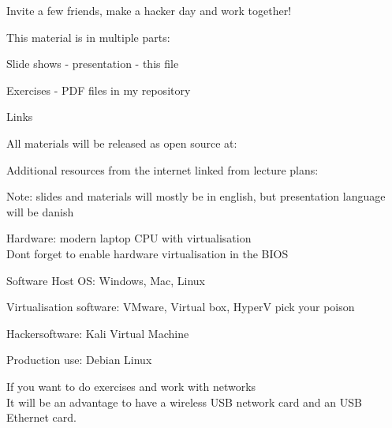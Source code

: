 \documentclass[Screen16to9,17pt]{foils}
\begin{document}
\vskip 1cm

\centerline{\LARGE Invite a few friends, make a hacker day and work together!}


\begin{list1}
\item This material is in multiple parts:
\begin{list2}
\item Slide shows - presentation - this file
\item Exercises - PDF files in my repository
\end{list2}
\item Links
\begin{list2}
\item All materials will be released as open source at:\\
\item Additional resources from the internet linked from lecture plans:\\
\end{list2}
\end{list1}

Note: slides and materials will mostly be in english, but presentation language will be danish





\begin{list2}
\item Hardware: modern laptop CPU with virtualisation\\
Dont forget to enable hardware virtualisation in the BIOS
\item Software Host OS: Windows, Mac, Linux
\item Virtualisation software: VMware, Virtual box, HyperV pick your poison
\item Hackersoftware: Kali Virtual Machine 
\item Production use: Debian Linux 
\end{list2}




If you want to do exercises and work with networks \\
It will be an advantage to have a wireless USB network card and an USB Ethernet card.
\end{document}
